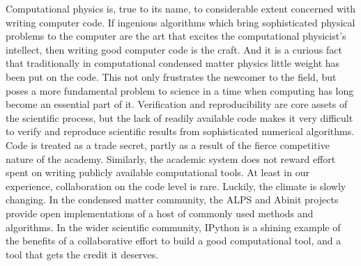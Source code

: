 Computational physics is, true to its name, to considerable extent concerned
with writing computer code. If ingenious algorithms which bring sophisticated
physical problems to the computer are the art that excites the computational
physicist's intellect, then writing good computer code is the craft. And it is a
curious fact that traditionally in computational condensed matter physics
little weight has been put on the code. This not only frustrates the newcomer to
the field, but poses a more fundamental problem to science in a time when
computing has long become an essential part of it. Verification and
reproducibility are core assets of the scientific process, but the lack of
readily available code makes it very difficult to verify and reproduce
scientific results from sophisticated numerical algorithms. Code is treated as a
trade secret, partly as a result of the fierce competitive nature of the
academy. Similarly, the academic system does not reward effort spent on writing
publicly available computational tools. At least in our experience,
collaboration on the code level is rare. Luckily, the climate is slowly
changing. In the condensed matter community, the ALPS and Abinit projects
provide open implementations of a host of commonly used methods and algorithms.
In the wider scientific community, IPython is a shining example of the benefits
of a collaborative effort to build a good computational tool, and a tool that
gets the credit it deserves.

